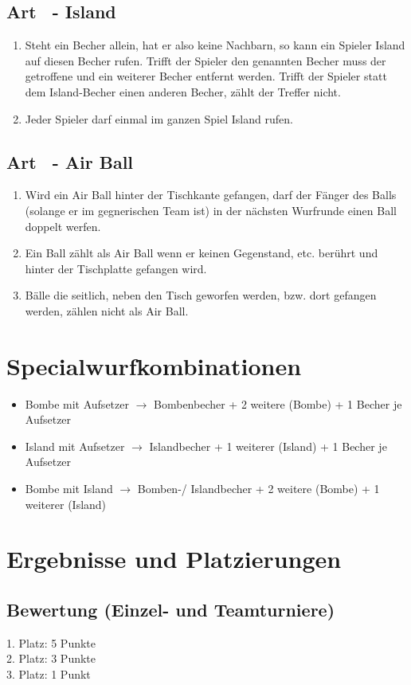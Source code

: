 \documentclass[a4paper,11pt]{scrartcl}
\newcommand{\enum}[1]{\begin{enumerate}[label=(\arabic*)]#1\end{enumerate}}
\newcommand{\art}[2]{\subsection*{#1} \enum{#2}}
\newcommand{\quot}[1]{\glqq #1\grqq}
\newcounter{art}
\begin{document}
    \art{Art \theart\ - \quot{Island}}{
        \item
            Steht ein Becher allein, hat er also keine Nachbarn, so kann ein Spieler \quot{Island} auf diesen Becher rufen. Trifft der Spieler den genannten Becher muss der getroffene und ein weiterer Becher entfernt werden. Trifft der Spieler statt dem \quot{Island}-Becher einen anderen Becher, zählt der Treffer nicht.
        \item
            Jeder Spieler darf einmal im ganzen Spiel \quot{Island} rufen.
    }

    \art{Art \theart\ - \quot{Air Ball}}{
        \item
            Wird ein \quot{Air Ball} hinter der Tischkante gefangen, darf der Fänger des Balls (solange er im gegnerischen Team ist) in der nächsten Wurfrunde einen Ball doppelt werfen.
        \item
            Ein Ball zählt als \quot{Air Ball} wenn er keinen Gegenstand, etc. berührt und hinter der Tischplatte gefangen wird.
        \item
            Bälle die seitlich, neben den Tisch geworfen werden, bzw. dort gefangen werden, zählen nicht als \quot{Air Ball}.
    }

\section{Specialwurfkombinationen}
    \begin{itemize}
        \item
            Bombe mit Aufsetzer $\rightarrow$ Bombenbecher + 2 weitere (Bombe) + 1 Becher je Aufsetzer
        \item
            Island mit Aufsetzer $\rightarrow$ Islandbecher + 1 weiterer (Island) + 1 Becher je Aufsetzer
        \item
            Bombe mit Island $\rightarrow$ Bomben-/ Islandbecher + 2 weitere (Bombe) + 1 weiterer (Island)
    \end{itemize}

\newpage

\section{Ergebnisse und Platzierungen}
    \subsection{Bewertung (Einzel- und Teamturniere)}
    1. Platz: 5 Punkte\\
    2. Platz: 3 Punkte\\
    3. Platz: 1 Punkt
\end{document}
